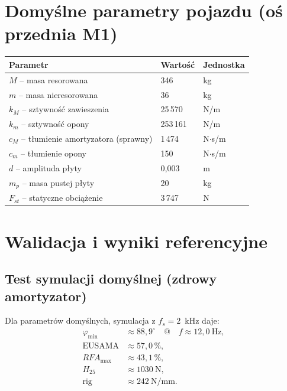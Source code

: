\documentclass[11pt,a4paper]{article}
\theoremstyle{plainpol}
\begin{document}
\section{Domyślne parametry pojazdu (oś przednia M1)}

\begin{center}
\begin{tabular}{lll}
\toprule
\textbf{Parametr} & \textbf{Wartość} & \textbf{Jednostka} \\
\midrule
$M$ -- masa resorowana   & 346     & kg \\
$m$ -- masa nieresorowana & 36      & kg \\
$k_M$ -- sztywność zawieszenia & 25\,570 & N/m \\
$k_m$ -- sztywność opony      & 253\,161 & N/m \\
$c_M$ -- tłumienie amortyzatora (sprawny) & 1\,474 & N$\cdot$s/m \\
$c_m$ -- tłumienie opony     & 150     & N$\cdot$s/m \\
$d$  -- amplituda płyty       & 0{,}003 & m \\
$m_p$ -- masa pustej płyty    & 20      & kg \\
$F_{st}$ -- statyczne obciążenie & 3\,747 & N \\
\bottomrule
\end{tabular}
\end{center}

\section{Walidacja i wyniki referencyjne}

\subsection{Test symulacji domyślnej (zdrowy amortyzator)}

Dla parametrów domyślnych, symulacja z $f_s = 2$~kHz daje:
\begin{align}
  \varphi_{\min}   &\approx 88{,}9^\circ \quad @ \quad f \approx 12{,}0~\mathrm{Hz}, \\
  \mathrm{EUSAMA}  &\approx 57{,}0\,\%, \\
  RFA_{\max}       &\approx 43{,}1\,\%, \\
  H_{25}           &\approx 1030~\mathrm{N},\\
  \mathrm{rig}     &\approx 242~\mathrm{N/mm}.
\end{align}
\end{document}
